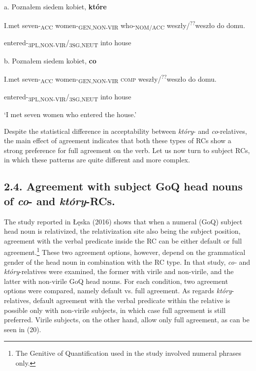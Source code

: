 \documentclass[output=paper]{langsci/langscibook}
\begin{document}
          a.   Poznałem   siedem   kobiet,     \textbf{które}

    I.met     seven-\textsubscript{ACC}   women-\textsubscript{GEN,NON-VIR}  who-\textsubscript{NOM/ACC}           weszły/\textsuperscript{??}weszło       do   domu.

    entered-\textsubscript{3PL,NON-VIR}/\textsubscript{3SG,NEUT}   into   house  

  b.   Poznałem   siedem   kobiet,     \textbf{co}

    I.met     seven-\textsubscript{ACC}   women-\textsubscript{GEN,NON-VIR}  \textsc{comp}              weszły/\textsuperscript{??}weszło       do   domu.

    entered-\textsubscript{3PL,NON-VIR}/\textsubscript{3SG,NEUT}   into  house  

 ‘I met seven women who entered the house.’

\begin{styleListParagraph}
Despite the statistical difference in acceptability between \textit{który}{}- and \textit{co}{}-relatives, the main effect of agreement indicates that both these types of RCs show a strong preference for full agreement on the verb. Let us now turn to subject RCs, in which these patterns are quite different and more complex. 
\end{styleListParagraph}

\subsection{ 2.4. Agreement with subject GoQ head nouns of \textit{co}{}- and \textit{który}{}-RCs.}

\begin{styleListParagraph}
The study reported in Łęska (2016) shows that when a numeral (GoQ) subject head noun is relativized, the relativization site also being the subject position, agreement with the verbal predicate inside the RC can be either default or full agreement.\footnote{The Genitive of Quantification used in the study involved numeral phrases only.} These two agreement options, however, depend on the grammatical gender of the head noun in combination with the RC type. In that study, \textit{co-} and \textit{który}{}-relatives were examined, the former with virile and non-virile, and the latter with non-virile GoQ head nouns. For each condition, two agreement options were compared, namely default vs. full agreement. As regards \textit{który}{}-relatives, default agreement with the verbal predicate within the relative is possible only with non-virile subjects, in which case full agreement is still preferred. Virile subjects, on the other hand, allow only full agreement, as can be seen in (20).
\end{styleListParagraph}
\end{document}
